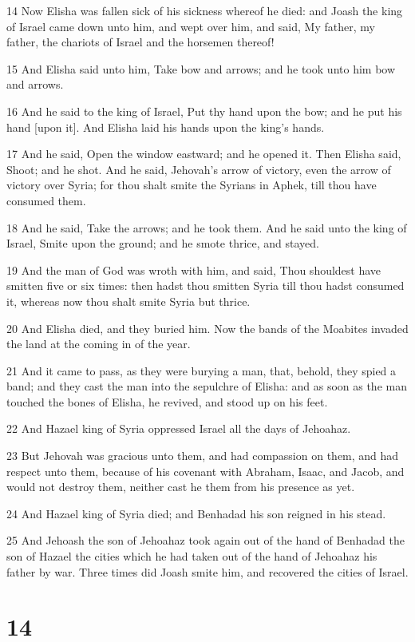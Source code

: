 \par 14 Now Elisha was fallen sick of his sickness whereof he died: and Joash the king of Israel came down unto him, and wept over him, and said, My father, my father, the chariots of Israel and the horsemen thereof!
\par 15 And Elisha said unto him, Take bow and arrows; and he took unto him bow and arrows.
\par 16 And he said to the king of Israel, Put thy hand upon the bow; and he put his hand [upon it]. And Elisha laid his hands upon the king's hands.
\par 17 And he said, Open the window eastward; and he opened it. Then Elisha said, Shoot; and he shot. And he said, Jehovah's arrow of victory, even the arrow of victory over Syria; for thou shalt smite the Syrians in Aphek, till thou have consumed them.
\par 18 And he said, Take the arrows; and he took them. And he said unto the king of Israel, Smite upon the ground; and he smote thrice, and stayed.
\par 19 And the man of God was wroth with him, and said, Thou shouldest have smitten five or six times: then hadst thou smitten Syria till thou hadst consumed it, whereas now thou shalt smite Syria but thrice.
\par 20 And Elisha died, and they buried him. Now the bands of the Moabites invaded the land at the coming in of the year.
\par 21 And it came to pass, as they were burying a man, that, behold, they spied a band; and they cast the man into the sepulchre of Elisha: and as soon as the man touched the bones of Elisha, he revived, and stood up on his feet.
\par 22 And Hazael king of Syria oppressed Israel all the days of Jehoahaz.
\par 23 But Jehovah was gracious unto them, and had compassion on them, and had respect unto them, because of his covenant with Abraham, Isaac, and Jacob, and would not destroy them, neither cast he them from his presence as yet.
\par 24 And Hazael king of Syria died; and Benhadad his son reigned in his stead.
\par 25 And Jehoash the son of Jehoahaz took again out of the hand of Benhadad the son of Hazael the cities which he had taken out of the hand of Jehoahaz his father by war. Three times did Joash smite him, and recovered the cities of Israel.

\chapter{14}

